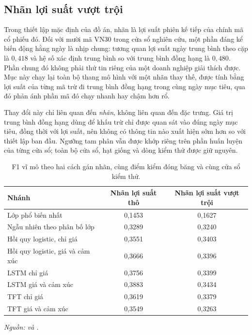 \documentclass[12pt, a4paper, oneside]{report}
\begin{document}
\subsection{Nhãn lợi suất vượt trội}
\label{sec:kq-excess}

Trong thiết lập mặc định của đồ án, nhãn là lợi suất phiên kế tiếp của chính mã cổ phiếu đó. Đối với mười mã VN30 trong cửa sổ nghiên cứu, một phần đáng kể biến động hằng ngày là nhịp chung: tương quan lợi suất ngày trung bình theo cặp là $0{,}418$ và hệ số xác định trung bình so với trung bình đồng hạng là $0{,}480$. Phần chung đó không phải thứ tin riêng của một doanh nghiệp giải thích được. Mục này chạy lại toàn bộ thang mô hình với một nhãn thay thế, được tính bằng lợi suất của từng mã trừ đi trung bình đồng hạng trong cùng ngày mục tiêu, qua đó phản ánh phần mã đó chạy nhanh hay chậm hơn rổ.

Thay đổi này chỉ liên quan đến \emph{nhãn}, không liên quan đến đặc trưng. Giá trị trung bình đồng hạng dùng để khấu trừ chỉ được quan sát vào đúng ngày mục tiêu, đồng thời với lợi suất, nên không có thông tin nào xuất hiện sớm hơn so với thiết lập ban đầu. Ngưỡng tam phân vẫn được khớp riêng trên phần huấn luyện của từng cửa sổ; toàn bộ cửa sổ, hạt giống và dòng kiểm thử được giữ nguyên.

\begin{table}[H]
  \centering
  \caption{F1 vĩ mô theo hai cách gán nhãn, cùng điểm kiểm đóng băng và cùng cửa sổ kiểm thử.}
  \label{tab:kq-excess}
  \begin{tabular}{l c c}
    \toprule
    Nhánh & Nhãn lợi suất thô & Nhãn lợi suất vượt trội \\
    \midrule
    Lớp phổ biến nhất & 0,1453 & 0,1627 \\
    Ngẫu nhiên theo phân bố lớp & 0,3289 & 0,3240 \\
    Hồi quy logistic, chỉ giá & 0,3551 & 0,3403 \\
    Hồi quy logistic, giá và cảm xúc & 0,3666 & 0,3396 \\
    LSTM chỉ giá & 0,3756 & 0,3399 \\
    LSTM giá và cảm xúc & 0,3883 & 0,3434 \\
    TFT chỉ giá & 0,3619 & 0,3379 \\
    TFT giá và cảm xúc & 0,3549 & 0,3263 \\
    \bottomrule
  \end{tabular}
\noindent\textit{Nguồn:  và .}
\end{table}
\end{document}
